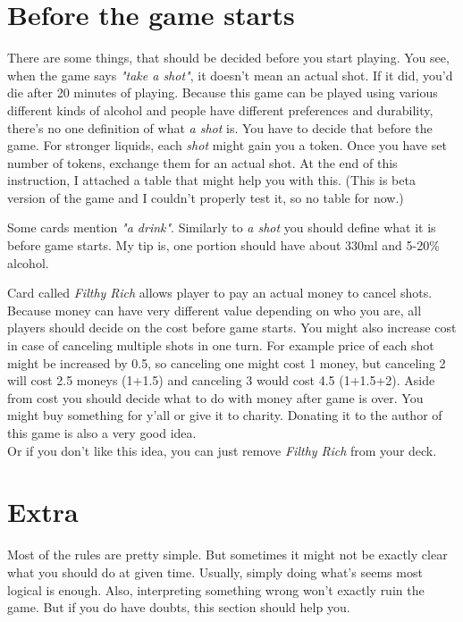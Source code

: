 \documentclass[notitlepage]{article}
\begin{document}
\section{Before the game starts}
There are some things, that should be decided before you start playing. You see, when the game says \textsl{"take a shot"}, it doesn't mean an actual shot. If it did, you'd die after 20 minutes of playing. Because this game can be played using various different kinds of alcohol and people have different preferences and durability, there's no one definition of what \textsl{a shot} is. You have to decide that before the game. For stronger liquids, each \textsl{shot} might gain you a token. Once you have set number of tokens, exchange them for an actual shot. At the end of this instruction, I attached a table that might help you with this.
(This is beta version of the game and I couldn't properly test it, so no table for now.)

Some cards mention \textsl{"a drink"}. Similarly to \textsl{a shot} you should define what it is before game starts. My tip is, one portion should have about 330ml and 5-20\% alcohol.

Card called \textsl{Filthy Rich} allows player to pay an actual money to cancel shots. Because money can have very different value depending on who you are, all players should decide on the cost before game starts. You might also increase cost in case of canceling multiple shots in one turn. For example price of each shot might be increased by 0.5, so canceling one might cost 1 money, but canceling 2 will cost 2.5 moneys (1+1.5) and canceling 3 would cost 4.5 (1+1.5+2).\newline
Aside from cost you should decide what to do with money after game is over. You might buy something for y'all or give it to charity. Donating it to the author of this game is also a very good idea. \\
Or if you don't like this idea, you can just remove \textsl{Filthy Rich} from your deck.

\section{Extra}
Most of the rules are pretty simple. But sometimes it might not be exactly clear what you should do at given time. Usually, simply doing what's seems most logical is enough. Also, interpreting something wrong won't exactly ruin the game. But if you do have doubts, this section should help you.
\end{document}
